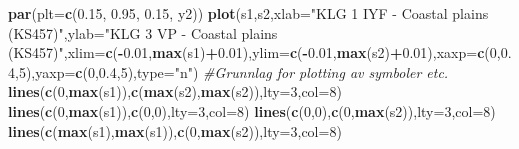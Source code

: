 \documentclass[]{article}
\newenvironment{Shaded}{\begin{snugshade}}{\end{snugshade}}
\newcommand{\CommentTok}[1]{\textcolor[rgb]{0.56,0.35,0.01}{\textit{#1}}}
\newcommand{\DataTypeTok}[1]{\textcolor[rgb]{0.13,0.29,0.53}{#1}}
\newcommand{\DecValTok}[1]{\textcolor[rgb]{0.00,0.00,0.81}{#1}}
\newcommand{\FloatTok}[1]{\textcolor[rgb]{0.00,0.00,0.81}{#1}}
\newcommand{\KeywordTok}[1]{\textcolor[rgb]{0.13,0.29,0.53}{\textbf{#1}}}
\newcommand{\NormalTok}[1]{#1}
\newcommand{\OperatorTok}[1]{\textcolor[rgb]{0.81,0.36,0.00}{\textbf{#1}}}
\newcommand{\StringTok}[1]{\textcolor[rgb]{0.31,0.60,0.02}{#1}}
\begin{document}
\begin{Shaded}
\begin{Highlighting}[]
\KeywordTok{par}\NormalTok{(}\DataTypeTok{plt=}\KeywordTok{c}\NormalTok{(}\FloatTok{0.15}\NormalTok{, }\FloatTok{0.95}\NormalTok{, }\FloatTok{0.15}\NormalTok{, y2))}
\KeywordTok{plot}\NormalTok{(s1,s2,}\DataTypeTok{xlab=}\StringTok{"KLG 1 IYF - Coastal plains (KS457)"}\NormalTok{,}\DataTypeTok{ylab=}\StringTok{"KLG 3 VP - Coastal plains (KS457)"}\NormalTok{,}\DataTypeTok{xlim=}\KeywordTok{c}\NormalTok{(}\OperatorTok{-}\FloatTok{0.01}\NormalTok{,}\KeywordTok{max}\NormalTok{(s1)}\OperatorTok{+}\FloatTok{0.01}\NormalTok{),}\DataTypeTok{ylim=}\KeywordTok{c}\NormalTok{(}\OperatorTok{-}\FloatTok{0.01}\NormalTok{,}\KeywordTok{max}\NormalTok{(s2)}\OperatorTok{+}\FloatTok{0.01}\NormalTok{),}\DataTypeTok{xaxp=}\KeywordTok{c}\NormalTok{(}\DecValTok{0}\NormalTok{,}\FloatTok{0.4}\NormalTok{,}\DecValTok{5}\NormalTok{),}\DataTypeTok{yaxp=}\KeywordTok{c}\NormalTok{(}\DecValTok{0}\NormalTok{,}\FloatTok{0.4}\NormalTok{,}\DecValTok{5}\NormalTok{),}\DataTypeTok{type=}\StringTok{"n"}\NormalTok{) }\CommentTok{#Grunnlag for plotting av symboler etc.}
\KeywordTok{lines}\NormalTok{(}\KeywordTok{c}\NormalTok{(}\DecValTok{0}\NormalTok{,}\KeywordTok{max}\NormalTok{(s1)),}\KeywordTok{c}\NormalTok{(}\KeywordTok{max}\NormalTok{(s2),}\KeywordTok{max}\NormalTok{(s2)),}\DataTypeTok{lty=}\DecValTok{3}\NormalTok{,}\DataTypeTok{col=}\DecValTok{8}\NormalTok{)}
\KeywordTok{lines}\NormalTok{(}\KeywordTok{c}\NormalTok{(}\DecValTok{0}\NormalTok{,}\KeywordTok{max}\NormalTok{(s1)),}\KeywordTok{c}\NormalTok{(}\DecValTok{0}\NormalTok{,}\DecValTok{0}\NormalTok{),}\DataTypeTok{lty=}\DecValTok{3}\NormalTok{,}\DataTypeTok{col=}\DecValTok{8}\NormalTok{)}
\KeywordTok{lines}\NormalTok{(}\KeywordTok{c}\NormalTok{(}\DecValTok{0}\NormalTok{,}\DecValTok{0}\NormalTok{),}\KeywordTok{c}\NormalTok{(}\DecValTok{0}\NormalTok{,}\KeywordTok{max}\NormalTok{(s2)),}\DataTypeTok{lty=}\DecValTok{3}\NormalTok{,}\DataTypeTok{col=}\DecValTok{8}\NormalTok{)}
\KeywordTok{lines}\NormalTok{(}\KeywordTok{c}\NormalTok{(}\KeywordTok{max}\NormalTok{(s1),}\KeywordTok{max}\NormalTok{(s1)),}\KeywordTok{c}\NormalTok{(}\DecValTok{0}\NormalTok{,}\KeywordTok{max}\NormalTok{(s2)),}\DataTypeTok{lty=}\DecValTok{3}\NormalTok{,}\DataTypeTok{col=}\DecValTok{8}\NormalTok{)}


\end{Highlighting}
\end{Shaded}
\end{document}
